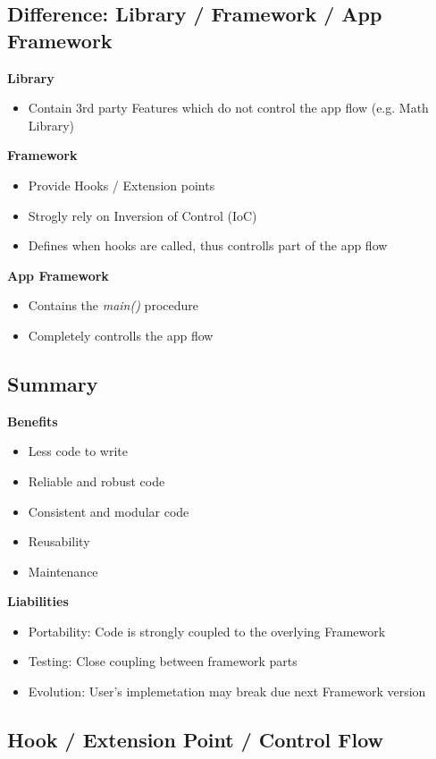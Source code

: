 \subsection{Difference: Library / Framework / App Framework}
\textbf{Library}
\begin{itemize}
    \item Contain 3rd party Features which do not control the app flow (e.g. Math Library)
\end{itemize}
\textbf{Framework}
\begin{itemize}
    \item Provide Hooks / Extension points
    \item Strogly rely on Inversion of Control (IoC)
    \item Defines when hooks are called, thus controlls part of the app flow
\end{itemize}
\textbf{App Framework}
\begin{itemize}
    \item Contains the \textit{main()} procedure
    \item Completely controlls the app flow
\end{itemize}

\subsection{Summary}
\textbf{Benefits}
\begin{itemize}
    \item Less code to write
    \item Reliable and robust code
    \item Consistent and modular code
    \item Reusability
    \item Maintenance
\end{itemize}
\textbf{Liabilities}
\begin{itemize}
    \item Portability: Code is strongly coupled to the overlying Framework
    \item Testing: Close coupling between framework parts
    \item Evolution: User's implemetation may break due next Framework version
\end{itemize}

\subsection{Hook / Extension Point / Control Flow}
